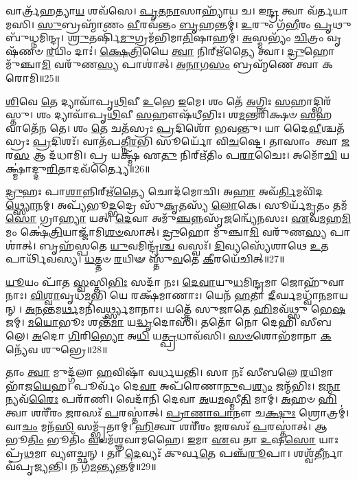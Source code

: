 𑌵𑌾𑌰𑍍𑌤𑍍𑌰᳴𑌹𑌤𑍍𑌯𑌾\-\ul{𑌯} 𑌶𑌵᳴𑌸𑍇।
\-\ul{𑌪𑍃}\-\-\ul{𑌤}\-\-\ul{𑌨𑌾}\-𑌸𑌾𑌹𑍍𑌯𑌾᳴𑌯 𑌚।
𑌇\-\ul{𑌨𑍍𑌦𑍍𑌰} 𑌤𑍍𑌵𑌾 𑌵᳴𑌰𑍍𑌤𑌯𑌾𑌮𑌸𑌿।
\-\ul{𑌸𑍁}\-𑌬𑍍𑌰𑌹𑍍𑌮𑌾᳴𑌣𑌂 \ul{𑌵𑍀}\-𑌰𑌵᳴𑌨𑍍𑌤𑌂 \ul{𑌬𑍃}\-𑌹𑌨𑍍𑌤𑌮𑍍॑।
\-\ul{𑌉}\-𑌰𑍁𑌂 𑌗᳴\-\ul{𑌭𑍀}\-𑌰𑌂 \ul{𑌪𑍃}\-𑌥𑍁𑌬𑍁᳴𑌧𑍍𑌨𑌮𑌿𑌨𑍍𑌦𑍍𑌰।
\-\ul{𑌶𑍍𑌰𑍁}\-𑌤𑌰𑍍\mbox{}𑌷𑌿᳴\-\ul{𑌮𑍁}\-𑌗𑍍𑌰𑌮᳴𑌭𑌿𑌮𑌾\-\ul{𑌤𑌿}\-𑌷𑌾𑌹𑌮𑍍॑।
\-\ul{𑌅}\-𑌸𑍍𑌮𑌭𑍍𑌯𑌂᳴ \ul{𑌚𑌿}\-𑌤𑍍𑌰𑌂 𑌵𑍃𑌷᳴𑌣𑍞 \ul{𑌰}\-𑌯𑌿𑌂 𑌦𑌾𑌃॑।
\-\ul{𑌕𑍍𑌷𑍇}\-\-\ul{𑌤𑍍𑌰𑌿}\-𑌯𑍈 \ul{𑌤𑍍𑌵𑌾} 𑌨𑌿𑌰𑍍\mbox{}𑌋᳴𑌤𑍍𑌯𑍈 𑌤𑍍𑌵𑌾।
\-\ul{𑌦𑍍𑌰𑍁}\-𑌹𑍋 𑌮𑍁᳴𑌞𑍍𑌚𑌾\-\ul{𑌮𑌿} 𑌵𑌰𑍁᳴𑌣\-\ul{𑌸𑍍𑌯} 𑌪𑌾𑌶𑌾॑𑌤𑍍।
\-\ul{𑌅}\-\-\ul{𑌨𑌾}\-𑌗\-\ul{𑌸𑌂} 𑌬𑍍𑌰𑌹𑍍𑌮᳴𑌣𑍇 𑌤𑍍𑌵𑌾 𑌕𑌰𑍋𑌮𑌿॥25॥

\-\ul{𑌶𑌿}\-𑌵𑍇 \ul{𑌤𑍇} 𑌦𑍍𑌯𑌾𑌵𑌾᳴𑌪𑍃\-\ul{𑌥𑌿}\-𑌵𑍀 \ul{𑌉}\-𑌭𑍇 \ul{𑌇}\-𑌮𑍇।
𑌶𑌂 𑌤𑍇᳴ \ul{𑌅}\-𑌗𑍍𑌨𑌿𑌃 \ul{𑌸}\-𑌹𑌾𑌦𑍍𑌭𑌿𑌰᳴𑌸𑍍𑌤𑍁।
𑌶𑌂 𑌦𑍍𑌯𑌾𑌵𑌾᳴𑌪𑍃\-\ul{𑌥𑌿}\-𑌵𑍀 \ul{𑌸}\-𑌹𑍗𑌷᳴𑌧𑍀𑌭𑌿𑌃।
𑌶\-\ul{𑌮}\-𑌨𑍍𑌤𑌰𑌿᳴𑌕𑍍𑌷𑍞 \ul{𑌸}\-𑌹 𑌵𑌾𑌤𑍇᳴𑌨 𑌤𑍇।
𑌶𑌂 \ul{𑌤𑍇} 𑌚𑌤᳴𑌸𑍍𑌰𑌃 \ul{𑌪𑍍𑌰}\-𑌦𑌿𑌶𑍋᳴ 𑌭𑌵𑌨𑍍𑌤𑍁।
𑌯𑌾 𑌦𑍈\-\ul{𑌵𑍀}\-𑌶𑍍𑌚𑌤᳴𑌸𑍍𑌰𑌃 \ul{𑌪𑍍𑌰}\-𑌦𑌿𑌶𑌃᳴।
𑌵𑌾𑌤᳴𑌪𑌤𑍍𑌨𑍀\-\ul{𑌰}\-𑌭𑌿 𑌸𑍂𑌰𑍍𑌯𑍋᳴ 𑌵𑌿\-\ul{𑌚}\-𑌷𑍍𑌟𑍇।
𑌤𑌾𑌸𑌾𑌂 𑌤𑍍𑌵𑌾 \ul{𑌜}\-𑌰\-\ul{𑌸} 𑌆 𑌦᳴𑌧𑌾𑌮𑌿।
𑌪𑍍𑌰 𑌯𑌕𑍍𑌷𑍍𑌮᳴ 𑌏\-\ul{𑌤𑍁} 𑌨𑌿𑌰𑍍\mbox{}𑌋᳴𑌤𑌿𑌂 𑌪\-\ul{𑌰𑌾}\-𑌚𑍈𑌃।
𑌅𑌮𑍋᳴\-\ul{𑌚𑌿} 𑌯𑌕𑍍𑌷𑍍𑌮𑌾॑𑌦𑍍𑌦𑍁\-\ul{𑌰𑌿}\-𑌤𑌾𑌦𑌵᳴𑌰𑍍𑌤𑍍𑌯𑍈॥26॥

\-\ul{𑌦𑍍𑌰𑍁}\-𑌹𑌃 𑌪𑌾\-\ul{𑌶𑌾}\-𑌨𑍍𑌨𑌿𑌰𑍍\mbox{}𑌋᳴\-\ul{𑌤𑍍𑌯𑍈} 𑌚𑍋𑌦᳴𑌮𑍋𑌚𑌿।
𑌅\-\ul{𑌹𑌾} 𑌅𑌵᳴\-\ul{𑌰𑍍𑌤𑌿}\-𑌮𑌵𑌿᳴𑌦\-\ul{𑌥𑍍𑌸𑍍𑌯𑍋}\-𑌨𑌮𑍍।
𑌅𑌪𑍍𑌯᳴𑌭𑍂\-\ul{𑌦𑍍𑌭}\-𑌦𑍍𑌰𑍇 𑌸𑍁᳴\-\ul{𑌕𑍃}\-𑌤𑌸𑍍𑌯᳴ \ul{𑌲𑍋}\-𑌕𑍇।
𑌸𑍂𑌰𑍍𑌯᳴\-\ul{𑌮𑍃}\-𑌤𑌂 𑌤𑌮᳴\-\ul{𑌸𑍋} 𑌗𑍍𑌰𑌾\-\ul{𑌹𑍍𑌯𑌾} 𑌯𑌤𑍍।
\-\ul{𑌦𑍇}\-𑌵𑌾 𑌅𑌮𑍁᳴\-\ul{𑌞𑍍𑌚}\-𑌨𑍍𑌨𑌸𑍃᳴\-\ul{𑌜}\-𑌨𑍍𑌵𑍍𑌯𑍇᳴𑌨𑌸𑌃।
\-\ul{𑌏}\-𑌵\-\ul{𑌮}\-𑌹\-\ul{𑌮𑌿}\-𑌮𑌂 𑌕𑍍𑌷𑍇॑\-\ul{𑌤𑍍𑌰𑌿}\-𑌯𑌾𑌜𑍍𑌜𑌾᳴𑌮𑌿\-\ul{𑌶}\-\-\ul{𑍞}\-𑌸𑌾𑌤𑍍।
\-\ul{𑌦𑍍𑌰𑍁}\-𑌹𑍋 𑌮𑍁᳴𑌞𑍍𑌚𑌾\-\ul{𑌮𑌿} 𑌵𑌰𑍁᳴𑌣\-\ul{𑌸𑍍𑌯} 𑌪𑌾𑌶𑌾॑𑌤𑍍।
𑌬𑍃𑌹᳴𑌸𑍍𑌪𑌤𑍇 \ul{𑌯𑍁}\-𑌵𑌮𑌿𑌨𑍍𑌦𑍍𑌰᳴\-\ul{𑌶𑍍𑌚} 𑌵𑌸𑍍𑌵𑌃᳴।
\-\ul{𑌦𑌿}\-𑌵𑍍𑌯𑌸𑍍𑌯𑍇᳴𑌶𑌾𑌥𑍇 \ul{𑌉}\-𑌤 𑌪𑌾𑌰𑍍𑌥𑌿᳴𑌵𑌸𑍍𑌯।
\-\ul{𑌧}\-𑌤𑍍𑌤𑍞 \ul{𑌰}\-𑌯𑌿𑍟 𑌸𑍍𑌤𑍁᳴\-\ul{𑌵}\-𑌤𑍇 \ul{𑌕𑍀}\-𑌰𑌯𑍇᳴𑌚𑌿𑌤𑍍॥27॥

\-\ul{𑌯𑍂}\-𑌯𑌂 𑌪𑌾᳴𑌤 \ul{𑌸𑍍𑌵}\-𑌸𑍍𑌤𑌿\-\ul{𑌭𑌿𑌃} 𑌸𑌦𑌾᳴ 𑌨𑌃।
\-\ul{𑌦𑍇}\-\-\ul{𑌵𑌾}\-𑌯𑍁\-\ul{𑌧}\-𑌮𑌿\-\ul{𑌨𑍍𑌦𑍍𑌰}\-𑌮𑌾 𑌜𑍋𑌹𑍁᳴𑌵𑌾𑌨𑌾𑌃।
\-\ul{𑌵𑌿}\-\-\ul{𑌶𑍍𑌵𑌾}\-𑌵𑍃𑌧᳴\-\ul{𑌮}\-𑌭𑌿 𑌯𑍇 𑌰𑌕𑍍𑌷᳴𑌮𑌾𑌣𑌾𑌃।
𑌯𑍇𑌨᳴ \ul{𑌹}\-𑌤𑌾 \ul{𑌦𑍀}\-𑌰𑍍𑌘𑌮𑌧𑍍𑌵𑌾᳴\-\ul{𑌨}\-𑌮𑌾𑌯𑌨𑍍।
\-\ul{𑌅}\-\-\ul{𑌨}\-𑌨𑍍𑌤𑌮\-\ul{𑌰𑍍𑌥}\-𑌮𑌨𑌿᳴𑌵𑌰𑍍𑌥𑍍𑌸𑍍𑌯𑌮𑌾𑌨𑌾𑌃।
𑌯𑌤𑍍𑌤𑍇᳴ 𑌸𑍁𑌜𑌾𑌤𑍇 \ul{𑌹𑌿}\-𑌮𑌵᳴𑌥𑍍𑌸𑍁 𑌭𑍇\-\ul{𑌷}\-𑌜𑌮𑍍।
\-\ul{𑌮}\-\-\ul{𑌯𑍋}\-𑌭𑍂𑌃 𑌶𑌨𑍍𑌤᳴\-\ul{𑌮𑌾} 𑌯\-\ul{𑌦𑍍𑌧𑍃}\-𑌦𑍋𑌸𑌿᳴।
𑌤𑌤𑍋᳴ 𑌨𑍋 𑌦𑍇𑌹𑌿 𑌸𑍀𑌬𑌲𑍇।
\-\ul{𑌅}\-𑌦𑍋 \ul{𑌗𑌿}\-𑌰𑌿\-\ul{𑌭𑍍𑌯𑍋} 𑌅\-\ul{𑌧𑌿} 𑌯\-\ul{𑌤𑍍𑌪𑍍𑌰}\-𑌧𑌾𑌵᳴𑌸𑌿।
\-\ul{𑌸}\-\-\ul{𑍞}\-𑌶𑍋𑌭᳴𑌮𑌾𑌨𑌾 \ul{𑌕}\-𑌨𑍍𑌯𑍇᳴𑌵 𑌶𑍁𑌭𑍍𑌰𑍇॥28॥

𑌤𑌾𑌂 \ul{𑌤𑍍𑌵𑌾} 𑌮𑍁𑌦𑍍𑌗᳴𑌲𑌾 \ul{𑌹}\-𑌵𑌿𑌷𑌾᳴ 𑌵𑌰𑍍𑌧𑌯𑌨𑍍𑌤𑌿।
𑌸𑌾 𑌨𑌃᳴ 𑌸𑍀𑌬𑌲𑍇 \ul{𑌰}\-𑌯𑌿𑌮𑌾 𑌭𑌾᳴𑌜\-\ul{𑌯𑍇}\-𑌹।
𑌪𑍂𑌰𑍍𑌵𑌂᳴ 𑌦𑍇\-\ul{𑌵𑌾} 𑌅𑌪᳴𑌰𑍇𑌣𑌾\-\ul{𑌨𑍁}\-𑌪\-\ul{𑌶𑍍𑌯𑌂} 𑌜𑌨𑍍𑌮᳴𑌭𑌿𑌃।
𑌜\-\ul{𑌨𑍍𑌮𑌾}\-𑌨𑍍𑌯𑌵᳴\-\ul{𑌰𑍈𑌃} 𑌪𑌰𑌾᳴𑌣𑌿।
𑌵𑍇𑌦𑌾᳴𑌨𑌿 𑌦𑍇𑌵𑌾 \ul{𑌅}\-𑌯\-\ul{𑌮}\-𑌸𑍍𑌮𑍀\-\ul{𑌤𑌿} 𑌮𑌾𑌮𑍍।
\-\ul{𑌅}\-𑌹𑍞 \ul{𑌹𑌿}\-𑌤𑍍𑌵𑌾 𑌶𑌰𑍀᳴𑌰𑌂 \ul{𑌜}\-𑌰𑌸𑌃᳴ \ul{𑌪}\-𑌰𑌸𑍍𑌤𑌾॑𑌤𑍍।
\-\ul{𑌪𑍍𑌰𑌾}\-\-\ul{𑌣𑌾}\-\-\ul{𑌪𑌾}\-𑌨𑍗 𑌚\-\ul{𑌕𑍍𑌷𑍁𑌃} 𑌶𑍍𑌰𑍋𑌤𑍍𑌰𑌮𑍍॑।
𑌵𑌾\-\ul{𑌚𑌂} 𑌮𑌨᳴\-\ul{𑌸𑌿} 𑌸𑌮𑍍𑌭𑍃᳴𑌤𑌾𑌮𑍍।
\-\ul{𑌹𑌿}\-𑌤𑍍𑌵𑌾 𑌶𑌰𑍀᳴𑌰𑌂 \ul{𑌜}\-𑌰𑌸𑌃᳴ \ul{𑌪}\-𑌰𑌸𑍍𑌤𑌾॑𑌤𑍍।
𑌆 𑌭𑍂\-\ul{𑌤𑌿𑌂} 𑌭𑍂𑌤𑌿𑌂᳴ \ul{𑌵}\-𑌯𑌮᳴𑌶𑍍𑌞𑌵𑌾𑌮𑌹𑍈।
\-\ul{𑌇}\-𑌮𑌾 \ul{𑌏}\-𑌵 𑌤𑌾 \ul{𑌉}\-𑌷\-\ul{𑌸𑍋} 𑌯𑌾𑌃 𑌪𑍍𑌰᳴\-\ul{𑌥}\-𑌮𑌾 𑌵𑍍𑌯𑍗𑌚𑍍𑌛𑌨𑍍।
𑌤𑌾 \ul{𑌦𑍇}\-𑌵𑍍𑌯𑌃᳴ 𑌕𑍁𑌰𑍍𑌵\-\ul{𑌤𑍇} 𑌪𑌞𑍍𑌚᳴\-\ul{𑌰𑍂}\-𑌪𑌾।
𑌶𑌶𑍍𑌵᳴\-\ul{𑌤𑍀}\-𑌰𑍍𑌨𑌾𑌵᳴𑌪𑍃𑌜𑍍𑌯𑌨𑍍𑌤𑌿।
𑌨 𑌗᳴\-\ul{𑌮}\-𑌨𑍍𑌤𑍍𑌯𑌨𑍍𑌤𑌮𑍍॑॥29॥\anuvakamend[\-\ul{𑌕}\-\-\ul{𑌰𑍋}\-𑌮𑍍𑌯𑌵᳴𑌰𑍍𑌤𑍍𑌯𑍈 𑌚𑌿𑌚𑍍𑌛𑍁𑌭𑍍𑌰𑍇\-𑌽𑌶𑍍𑌞𑌵𑌾𑌮𑌹𑍈 \ul{𑌚}\-𑌤𑍍𑌵𑌾𑌰𑌿᳴ 𑌚]

